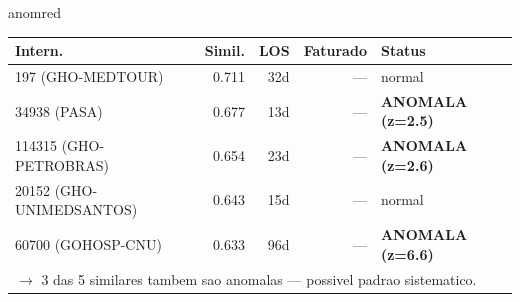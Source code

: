 \documentclass[a4paper,10pt]{article}
\begin{document}
\begin{anomalycard}[Internacao 155949 | GHO-PETROBRAS | CRITICO (z=5.27)]{anomred}
\begin{tabular}{l r r r l}\toprule\textbf{Intern.} & \textbf{Simil.} & \textbf{LOS} & \textbf{Faturado} & \textbf{Status} \\\midrule
197 (GHO-MEDTOUR) & 0.711 & 32d & --- & \textcolor{jcubeblue}{normal} \\
34938 (PASA) & 0.677 & 13d & --- & \textcolor{anomred}{\textbf{ANOMALA (z=2.5)}} \\
114315 (GHO-PETROBRAS) & 0.654 & 23d & --- & \textcolor{anomred}{\textbf{ANOMALA (z=2.6)}} \\
20152 (GHO-UNIMEDSANTOS) & 0.643 & 15d & --- & \textcolor{jcubeblue}{normal} \\
60700 (GOHOSP-CNU) & 0.633 & 96d & --- & \textcolor{anomred}{\textbf{ANOMALA (z=6.6)}} \\
\multicolumn{5}{l}{\textcolor{anomred}{\small $\rightarrow$ 3 das 5 similares tambem sao anomalas --- possivel padrao sistematico.}} \\
\bottomrule\end{tabular}



\end{anomalycard}

\newpage
\end{document}
